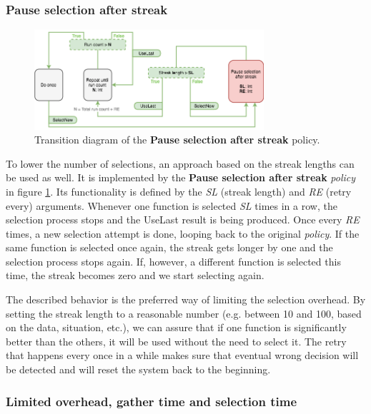 \subsubsection{Pause selection after streak}

\begin{figure}[h!]
	\captionsetup{justification=centering,margin=0.5cm}
	\centerline{\mbox{\includegraphics[width=85mm]{./img/pause_selection_after_streak.png}}}
	\caption{Transition diagram of the \textbf{Pause selection after streak} policy.}
	\label{fig:pause_selection_after_streak}
\end{figure}

To lower the number of selections, an approach based on the streak lengths can be used as well. It is implemented by the \textbf{Pause selection after streak} \textit{policy} in figure \ref{fig:pause_selection_after_streak}. Its functionality is defined by the \textit{SL} (streak length) and \textit{RE} (retry every) arguments. Whenever one function is selected \textit{SL} times in a row, the selection process stops and the UseLast result is being produced. Once every \textit{RE} times, a new selection attempt is done, looping back to the original \textit{policy}. If the same function is selected once again, the streak gets longer by one and the selection process stops again. If, however, a different function is selected this time, the streak becomes zero and we start selecting again.

The described behavior is the preferred way of limiting the selection overhead. By setting the streak length to a reasonable number (e.g. between 10 and 100, based on the data, situation, etc.), we can assure that if one function is significantly better than the others, it will be used without the need to select it. The retry that happens every once in a while makes sure that eventual wrong decision will be detected and will reset the system back to the beginning.

\subsubsection{Limited overhead, gather time and selection time}

